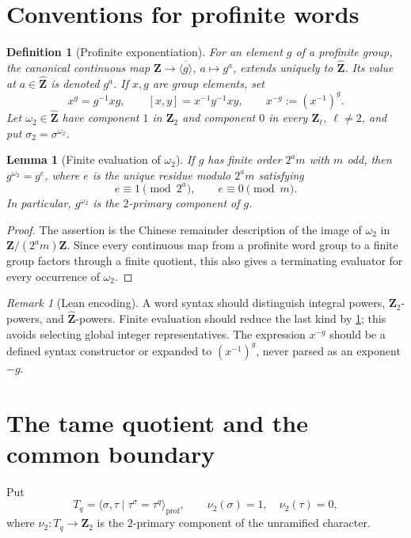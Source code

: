 \documentclass[11pt,reqno]{amsart}
\newtheorem{lemma}[theorem]{Lemma}
\newtheorem{definition}[theorem]{Definition}
\theoremstyle{remark}
\newtheorem{remark}[theorem]{Remark}
\numberwithin{equation}{section}
\newcommand{\Z}{\mathbf Z}
\newcommand{\prof}{\mathrm{prof}}
\newcommand{\whZ}{\widehat{\Z}}
\begin{document}
\section{Conventions for profinite words}

\begin{definition}[Profinite exponentiation]
For an element \(g\) of a profinite group, the canonical continuous map
\(\Z\to\overline{\langle g\rangle}\), \(a\mapsto g^a\), extends uniquely to
\(\whZ\).  Its value at \(a\in\whZ\) is denoted \(g^a\).  If \(x,g\) are
group elements, set
\[
 x^g=g^{-1}xg,\qquad [x,y]=x^{-1}y^{-1}xy,
 \qquad x^{-g}:=(x^{-1})^g.
\]
Let \(\omega_2\in\whZ\) have component \(1\) in \(\Z_2\) and component
\(0\) in every \(\Z_\ell\), \(\ell\ne2\), and put
\(\sigma_2=\sigma^{\omega_2}\).
\end{definition}

\begin{lemma}[Finite evaluation of \(\omega_2\)]\label{lem:omega-finite}
If \(g\) has finite order \(2^a m\) with \(m\) odd, then \(g^{\omega_2}=g^e\),
where \(e\) is the unique residue modulo \(2^a m\) satisfying
\[
 e\equiv1\pmod{2^a},\qquad e\equiv0\pmod m.
\]
In particular, \(g^{\omega_2}\) is the \(2\)-primary component of \(g\).
\end{lemma}

\begin{proof}
The assertion is the Chinese remainder description of the image of
\(\omega_2\) in \(\Z/(2^am)\Z\).  Since every continuous map from a
profinite word group to a finite group factors through a finite quotient,
this also gives a terminating evaluator for every occurrence of
\(\omega_2\).
\end{proof}

\begin{remark}[Lean encoding]
A word syntax should distinguish integral powers, \(\Z_2\)-powers, and
\(\whZ\)-powers.  Finite evaluation should reduce the last kind by
\cref{lem:omega-finite}; this avoids selecting global integer
representatives.  The expression \(x^{-g}\) should be a defined syntax
constructor or expanded to \((x^{-1})^g\), never parsed as an exponent
\(-g\).
\end{remark}

\section{The tame quotient and the common boundary}

Put
\[
 T_q=\langle\sigma,\tau\mid\tau^\sigma=\tau^q\rangle_{\prof},
 \qquad \nu_2(\sigma)=1,\quad\nu_2(\tau)=0,
\]
where \(\nu_2:T_q\to\Z_2\) is the \(2\)-primary component of the
unramified character.
\end{document}
